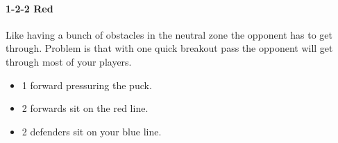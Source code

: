 \documentclass[10pt, french]{article}
\begin{document}
\begin{multicols*}{2}
\begin{minipage}{0.6\columnwidth}
\begin{tikzpicture}[x=0.75pt,y=0.75pt,yscale=-1,xscale=1]
\end{tikzpicture}

\end{minipage}

\paragraph{1-2-2 Red} Like having a bunch of obstacles in the neutral zone the opponent has to get through. Problem is that with one quick breakout pass the opponent will get through most of your players.

\begin{minipage}{0.4\columnwidth}
\begin{itemize}[leftmargin = *]
	\item	1 forward pressuring the puck.
	\item	2 forwards sit on the red line.
	\item	2 defenders sit on your blue line.
\end{itemize}
\end{minipage}
\begin{minipage}{0.6\columnwidth}

\begin{tikzpicture}[x=0.75pt,y=0.75pt,yscale=-1,xscale=1]


\end{tikzpicture}
\end{minipage}
\end{multicols*}
\end{document}
